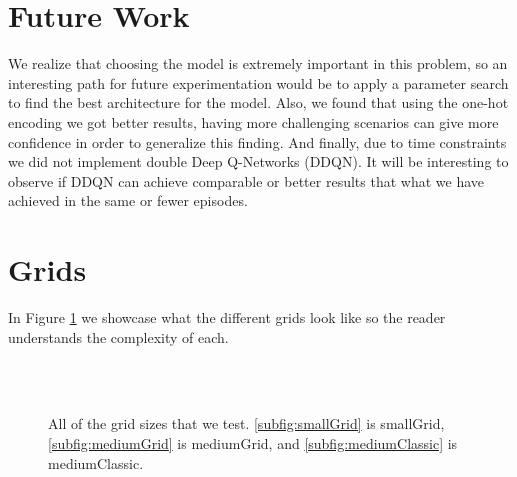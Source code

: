 \documentclass[conference]{IEEEtran}
\begin{document}
\section{Future Work}
We realize that choosing the model is extremely important in this problem, so an interesting path for future experimentation would be to apply a parameter search to find the best architecture for the model. Also, we found that using the one-hot encoding we got better results, having more challenging scenarios can give more confidence in order to generalize this finding. And finally, due to time constraints we did not implement double Deep Q-Networks (DDQN). It will be interesting to observe if DDQN can achieve comparable or better results that what we have achieved in the same or fewer episodes.

\printbibliography[title={References}]

\appendix
\section{Grids} \label{appendix:grids}

In Figure \ref{fig:grids} we showcase what the different grids look like so the reader understands the complexity of each.

\begin{figure}
     \\
     \\
    \caption{All of the grid sizes that we test. \ref{subfig:smallGrid} is smallGrid, \ref{subfig:mediumGrid} is mediumGrid, and \ref{subfig:mediumClassic} is mediumClassic.}
    \label{fig:grids}
\end{figure}
\end{document}
